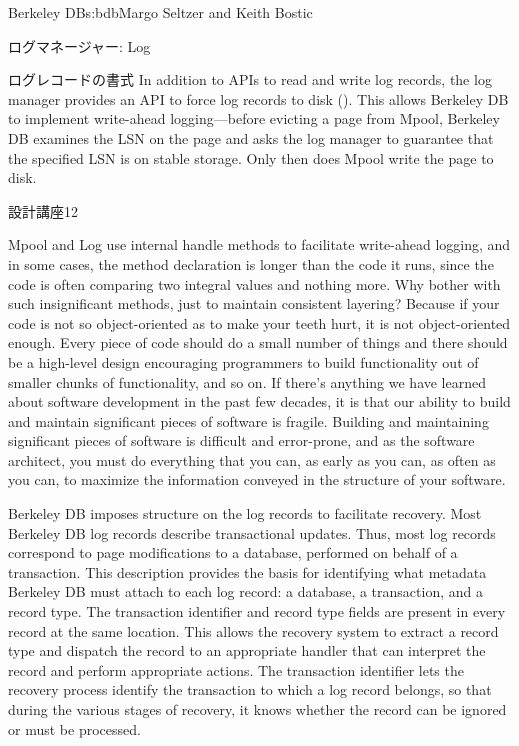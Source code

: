 \begin{aosachapter}{Berkeley DB}{s:bdb}{Margo Seltzer and Keith Bostic}
\begin{aosasect1}{ログマネージャー: Log}
\begin{aosasect2}{ログレコードの書式}
In addition to APIs to read and write log records, the log manager
provides an API to force log records to disk
().  This allows Berkeley DB to
implement write-ahead logging---before evicting a page from Mpool,
Berkeley DB examines the LSN on the page and asks the log manager to
guarantee that the specified LSN is on stable storage. Only then does
Mpool write the page to disk. 

\begin{aosabox}{設計講座12}

Mpool and Log use internal handle methods to facilitate write-ahead
logging, and in some cases, the method declaration is longer than the
code it runs, since the code is often comparing two integral values
and nothing more. Why bother with such insignificant methods, just to
maintain consistent layering?  Because if your code is not so
object-oriented as to make your teeth hurt, it is not object-oriented
enough. Every piece of code should do a small number of things and
there should be a high-level design encouraging programmers to build
functionality out of smaller chunks of functionality, and so on. If
there's anything we have learned about software development in the
past few decades, it is that our ability to build and maintain
significant pieces of software is fragile. Building and maintaining
significant pieces of software is difficult and error-prone, and as
the software architect, you must do everything that you can, as early
as you can, as often as you can, to maximize the information conveyed
in the structure of your software.

\end{aosabox}

Berkeley DB imposes structure on the log records to facilitate
recovery.  Most Berkeley DB log records describe transactional
updates. Thus, most log records correspond to page modifications to a
database, performed on behalf of a transaction. This description
provides the basis for identifying what metadata Berkeley DB must
attach to each log record: a database, a transaction, and a record
type. The transaction identifier and record type fields are present in every
record at the same location.  This allows the recovery system to
extract a record type and dispatch the record to an appropriate
handler that can interpret the record and perform appropriate
actions. The transaction identifier lets the recovery process identify the
transaction to which a log record belongs, so that during the various
stages of recovery, it knows whether the record can be ignored or must
be processed.


\end{aosasect2}
\end{aosasect1}
\end{aosachapter}
